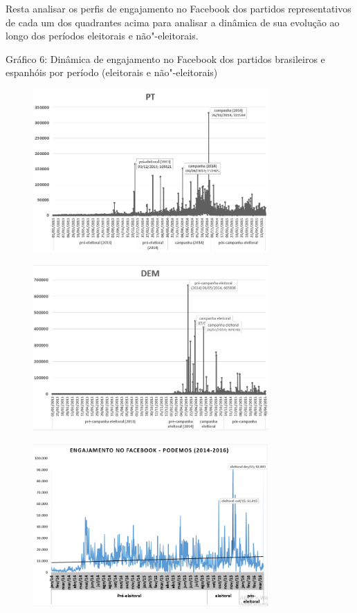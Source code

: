 Resta analisar os perfis de engajamento no Facebook dos partidos
representativos de cada um dos quadrantes acima para analisar a dinâmica
de sua evolução ao longo dos períodos eleitorais e não"-eleitorais.

Gráfico 6: Dinâmica de engajamento no Facebook dos partidos brasileiros
e espanhóis por período (eleitorais e não"-eleitorais)

\begin{figure}[!ht]
\centering
 \includegraphics[width=90mm]{./imgs/graf6_1.png}
\end{figure}

\begin{figure}[!ht]
\centering
 \includegraphics[width=90mm]{./imgs/graf6_2.png}
\end{figure}

\begin{figure}[!ht]
\centering
 \includegraphics[width=90mm]{./imgs/graf6_3.png}
\end{figure}


